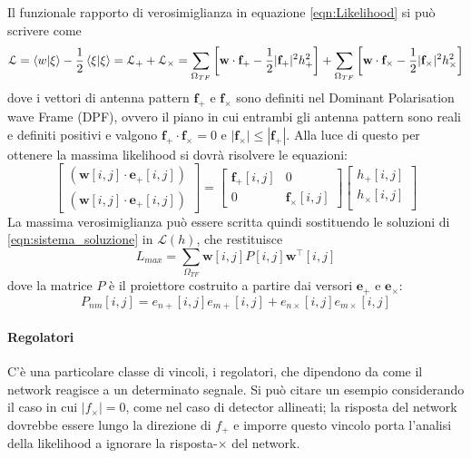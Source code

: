 Il funzionale rapporto di verosimiglianza in equazione \ref{eqn:Likelihood} si può scrivere come
\begin{equation}
	\mathcal{L} = \braket{w}{\xi} - \frac{1}{2} \braket{\xi}{\xi} = \mathcal{L}_+ + \mathcal{L}_\times = \sum_{\Omega_{TF}}\left[ \mathbf{w} \cdot \mathbf{f}_+ - \frac{1}{2}|\mathbf{f}_+|^2h_+^2\right] + \sum_{\Omega_{TF}}\left[ \mathbf{w} \cdot \mathbf{f}_\times - \frac{1}{2}|\mathbf{f}_\times|^2h_\times^2\right]
	\label{eqn:label_separated}
\end{equation}
dove i vettori di antenna pattern $\mathbf{f}_+$ e $\mathbf{f}_\times$ sono definiti nel Dominant Polarisation wave Frame (DPF), ovvero il piano in cui entrambi gli antenna pattern sono reali e definiti positivi e valgono $\mathbf{f}_+ \cdot \mathbf{f}_\times = 0$ e $ |\mathbf{f}_\times| \leq |\mathbf{f}_+|$.  Alla luce di questo per ottenere la massima likelihood si dovrà risolvere le equazioni:
\begin{equation}
	\begin{bmatrix}
	(\mathbf{w}[i,j]\cdot \mathbf{e}_+[i,j])\\
	(\mathbf{w}[i,j]\cdot \mathbf{e}_+[i,j])
	\end{bmatrix}
	=
	\begin{bmatrix}
	\mathbf{f}_+[i,j]	&0\\
	0					&\mathbf{f}_\times[i,j]
	\end{bmatrix}
	\begin{bmatrix}
	h_+[i,j]\\
	h_\times[i,j]\\
	\end{bmatrix}
	\label{eqn:sistema_soluzione}
\end{equation}
La massima verosimiglianza può essere scritta quindi sostituendo le soluzioni di \ref{eqn:sistema_soluzione} in $\mathcal{L}(h)$, che restituisce
\begin{equation}
	L_{max} = \sum_{\Omega_{TF}}\mathbf{w}[i,j]P[i,j]\mathbf{w}^\intercal[i,j]
\end{equation}
dove la matrice $P$ è il proiettore costruito a partire dai versori $\mathbf{e}_+$ e $\mathbf{e}_\times$:
\begin{equation}
	P_{nm}[i,j]=e_{n+}[i,j]e_{m+}[i,j]+e_{n\times}[i,j]e_{m\times}[i,j]
	\label{eqn:proiection}
\end{equation}

\paragraph{Regolatori} C'è una particolare classe di vincoli, i regolatori, che dipendono da come il network reagisce a un determinato segnale. Si può citare un esempio considerando il caso in cui $|f_\times|=0$, come nel caso di detector allineati; la risposta del network dovrebbe essere lungo la direzione di $f_+$ e imporre questo vincolo porta l'analisi della likelihood a ignorare la risposta-$\times$ del network.
